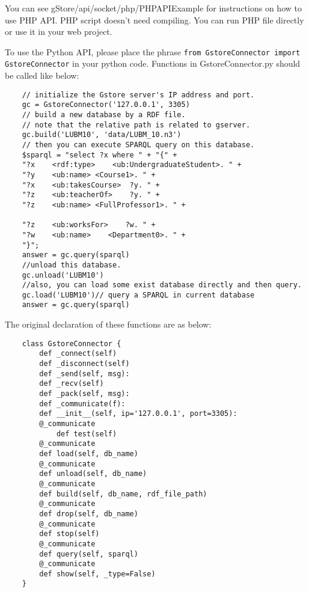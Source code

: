 \documentclass[titlepage, a4paper, 12pt]{article}
\begin{document}
	
	You can see gStore/api/socket/php/PHPAPIExample for instructions on how to use PHP API. PHP script doesn't need compiling. You can run PHP file directly or use it in your web project.
	

	
	
	To use the Python API, please place the phrase \texttt{from GstoreConnector import GstoreConnector} in your python code. Functions in GstoreConnector.py should be called like below:
	
	\begin{verbatim}
	// initialize the Gstore server's IP address and port.
	gc = GstoreConnector('127.0.0.1', 3305)
	// build a new database by a RDF file.
	// note that the relative path is related to gserver.
	gc.build('LUBM10', 'data/LUBM_10.n3')
	// then you can execute SPARQL query on this database.
	$sparql = "select ?x where " + "{" +
	"?x    <rdf:type>    <ub:UndergraduateStudent>. " +
	"?y    <ub:name> <Course1>. " +
	"?x    <ub:takesCourse>  ?y. " +
	"?z    <ub:teacherOf>    ?y. " +
	"?z    <ub:name> <FullProfessor1>. " +

	"?z    <ub:worksFor>    ?w. " +
	"?w    <ub:name>    <Department0>. " +
	"}";
	answer = gc.query(sparql)
	//unload this database.
	gc.unload('LUBM10')
	//also, you can load some exist database directly and then query.
	gc.load('LUBM10')// query a SPARQL in current database
	answer = gc.query(sparql)
	\end{verbatim}
	
	The original declaration of these functions are as below:
	
	\begin{verbatim}
	class GstoreConnector {
		def _connect(self)
		def _disconnect(self)
		def _send(self, msg):
		def _recv(self)
		def _pack(self, msg):
		def _communicate(f):
		def __init__(self, ip='127.0.0.1', port=3305):
		@_communicate
    		def test(self)
		@_communicate
		def load(self, db_name)
		@_communicate
		def unload(self, db_name)
		@_communicate
		def build(self, db_name, rdf_file_path)
		@_communicate
		def drop(self, db_name)
		@_communicate
		def stop(self)
		@_communicate
		def query(self, sparql)
		@_communicate
		def show(self, _type=False)
	}
	\end{verbatim}
	
\end{document}
